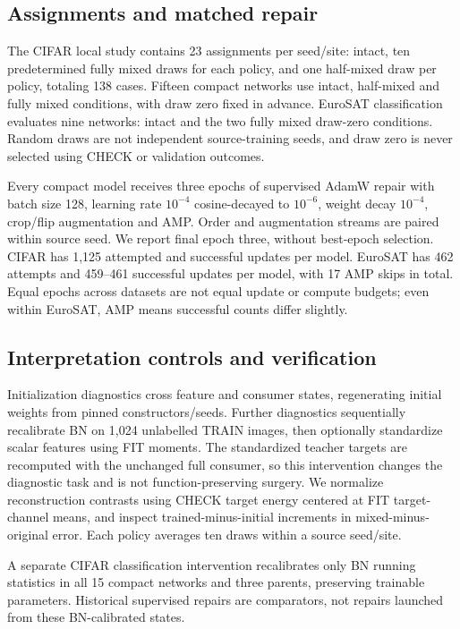 \documentclass[conference,letterpaper,10pt]{IEEEtran}
\begin{document}
\subsection{Assignments and matched repair}
The CIFAR local study contains 23 assignments per seed/site: intact, ten predetermined fully mixed draws for each policy, and one half-mixed draw per policy, totaling 138 cases. Fifteen compact networks use intact, half-mixed and fully mixed conditions, with draw zero fixed in advance. EuroSAT classification evaluates nine networks: intact and the two fully mixed draw-zero conditions. Random draws are not independent source-training seeds, and draw zero is never selected using CHECK or validation outcomes.

Every compact model receives three epochs of supervised AdamW repair with batch size 128, learning rate $10^{-4}$ cosine-decayed to $10^{-6}$, weight decay $10^{-4}$, crop/flip augmentation and AMP. Order and augmentation streams are paired within source seed. We report final epoch three, without best-epoch selection. CIFAR has 1,125 attempted and successful updates per model. EuroSAT has 462 attempts and 459--461 successful updates per model, with 17 AMP skips in total. Equal epochs across datasets are not equal update or compute budgets; even within EuroSAT, AMP means successful counts differ slightly.

\subsection{Interpretation controls and verification}
Initialization diagnostics cross feature and consumer states, regenerating initial weights from pinned constructors/seeds. Further diagnostics sequentially recalibrate BN on 1,024 unlabelled TRAIN images, then optionally standardize scalar features using FIT moments. The standardized teacher targets are recomputed with the unchanged full consumer, so this intervention changes the diagnostic task and is not function-preserving surgery. We normalize reconstruction contrasts using CHECK target energy centered at FIT target-channel means, and inspect trained-minus-initial increments in mixed-minus-original error. Each policy averages ten draws within a source seed/site.

A separate CIFAR classification intervention recalibrates only BN running statistics in all 15 compact networks and three parents, preserving trainable parameters. Historical supervised repairs are comparators, not repairs launched from these BN-calibrated states.
\end{document}
